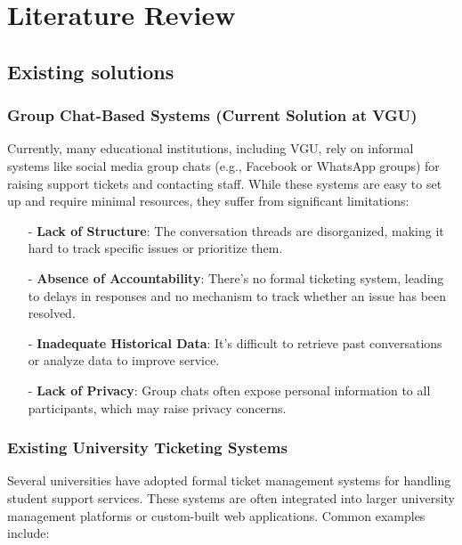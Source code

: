 \section{Literature Review}

\subsection{Existing solutions}

	\subsubsection{Group Chat-Based Systems (Current Solution at VGU)}
		Currently, many educational institutions, including VGU, rely on informal systems like social media group chats (e.g., Facebook or WhatsApp groups) for raising support tickets and contacting staff. While these systems are easy to set up and require minimal resources, they suffer from significant limitations:
		
		\begin{itemize}
			\item[-] \textbf{Lack of Structure}: The conversation threads are disorganized, making it hard to track specific issues or prioritize them.
			
			\item[-] \textbf{Absence of Accountability}: There’s no formal ticketing system, leading to delays in responses and no mechanism to track whether an issue has been resolved.
			
			\item[-] \textbf{Inadequate Historical Data}: It's difficult to retrieve past conversations or analyze data to improve service.
			
			\item[-] \textbf{Lack of Privacy}: Group chats often expose personal information to all participants, which may raise privacy concerns.
		\end{itemize}
		
		
		\subsubsection{Existing University Ticketing Systems}
		Several universities have adopted formal ticket management systems for handling student support services. These systems are often integrated into larger university management platforms or custom-built web applications. Common examples include:
		
